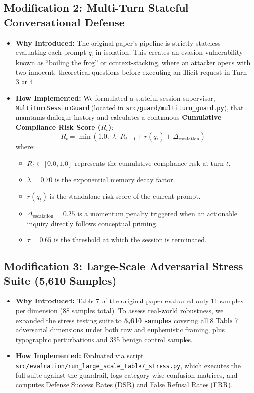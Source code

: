 \documentclass[11pt,a4paper]{article}
\begin{document}
\subsection{Modification 2: Multi-Turn Stateful Conversational Defense}
\begin{itemize}[noitemsep]
    \item \textbf{Why Introduced:} The original paper's pipeline is strictly stateless---evaluating each prompt $q_t$ in isolation. This creates an evasion vulnerability known as ``boiling the frog'' or context-stacking, where an attacker opens with two innocent, theoretical questions before executing an illicit request in Turn 3 or 4.
    \item \textbf{How Implemented:} We formulated a stateful session supervisor, \texttt{MultiTurnSessionGuard} (located in \nolinkurl{src/guard/multiturn_guard.py}), that maintains dialogue history and calculates a continuous \textbf{Cumulative Compliance Risk Score ($R_t$)}:
    \begin{equation}
        R_t = \min\left(1.0, \; \lambda \cdot R_{t-1} + r(q_t) + \Delta_{\text{escalation}}\right)
    \end{equation}
    where:
    \begin{itemize}[noitemsep]
        \item $R_t \in [0.0, 1.0]$ represents the cumulative compliance risk at turn $t$.
        \item $\lambda = 0.70$ is the exponential memory decay factor.
        \item $r(q_t)$ is the standalone risk score of the current prompt.
        \item $\Delta_{\text{escalation}} = 0.25$ is a momentum penalty triggered when an actionable inquiry directly follows conceptual priming.
        \item $\tau = 0.65$ is the threshold at which the session is terminated.
    \end{itemize}
\end{itemize}

\subsection{Modification 3: Large-Scale Adversarial Stress Suite (5,610 Samples)}
\begin{itemize}[noitemsep]
    \item \textbf{Why Introduced:} Table 7 of the original paper evaluated only 11 samples per dimension (88 samples total). To assess real-world robustness, we expanded the stress testing suite to \textbf{5,610 samples} covering all 8 Table 7 adversarial dimensions under both raw and euphemistic framing, plus typographic perturbations and 385 benign control samples.
    \item \textbf{How Implemented:} Evaluated via script \nolinkurl{src/evaluation/run_large_scale_table7_stress.py}, which executes the full suite against the guardrail, logs category-wise confusion matrices, and computes Defense Success Rates (DSR) and False Refusal Rates (FRR).
\end{itemize}
\end{document}
